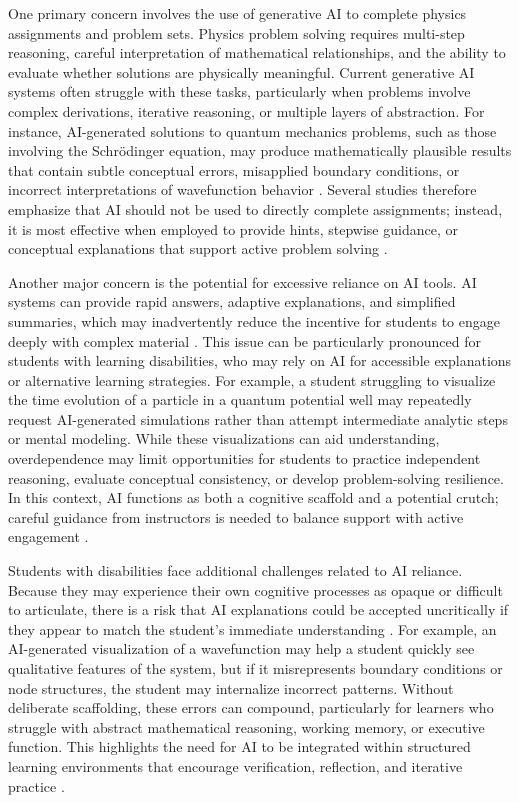 \documentclass[]{aastex701}
\begin{document}
One primary concern involves the use of generative AI to complete physics assignments and problem sets. Physics problem solving requires multi-step reasoning, careful interpretation of mathematical relationships, and the ability to evaluate whether solutions are physically meaningful. Current generative AI systems often struggle with these tasks, particularly when problems involve complex derivations, iterative reasoning, or multiple layers of abstraction. For instance, AI-generated solutions to quantum mechanics problems, such as those involving the Schr\"{o}dinger equation, may produce mathematically plausible results that contain subtle conceptual errors, misapplied boundary conditions, or incorrect interpretations of wavefunction behavior \citep{Wattanakasiwich2025, Weijers2025, Singh2001}. Several studies therefore emphasize that AI should not be used to directly complete assignments; instead, it is most effective when employed to provide hints, stepwise guidance, or conceptual explanations that support active problem solving \citep{Wattanakasiwich2025, Weijers2025}.

Another major concern is the potential for excessive reliance on AI tools. AI systems can provide rapid answers, adaptive explanations, and simplified summaries, which may inadvertently reduce the incentive for students to engage deeply with complex material \citep{Paglialunga2025, Voultsiou2025}. This issue can be particularly pronounced for students with learning disabilities, who may rely on AI for accessible explanations or alternative learning strategies. For example, a student struggling to visualize the time evolution of a particle in a quantum potential well may repeatedly request AI-generated simulations rather than attempt intermediate analytic steps or mental modeling. While these visualizations can aid understanding, overdependence may limit opportunities for students to practice independent reasoning, evaluate conceptual consistency, or develop problem-solving resilience. In this context, AI functions as both a cognitive scaffold and a potential crutch; careful guidance from instructors is needed to balance support with active engagement \citep{Paglialunga2025, Voultsiou2025, Khowaja2025, Singh2001}.

Students with disabilities face additional challenges related to AI reliance. Because they may experience their own cognitive processes as opaque or difficult to articulate, there is a risk that AI explanations could be accepted uncritically if they appear to match the student's immediate understanding \citep{Voultsiou2025, Khowaja2025}. For example, an AI-generated visualization of a wavefunction may help a student quickly see qualitative features of the system, but if it misrepresents boundary conditions or node structures, the student may internalize incorrect patterns. Without deliberate scaffolding, these errors can compound, particularly for learners who struggle with abstract mathematical reasoning, working memory, or executive function. This highlights the need for AI to be integrated within structured learning environments that encourage verification, reflection, and iterative practice \citep{Paglialunga2025, Voultsiou2025, Weijers2025}.
\end{document}
